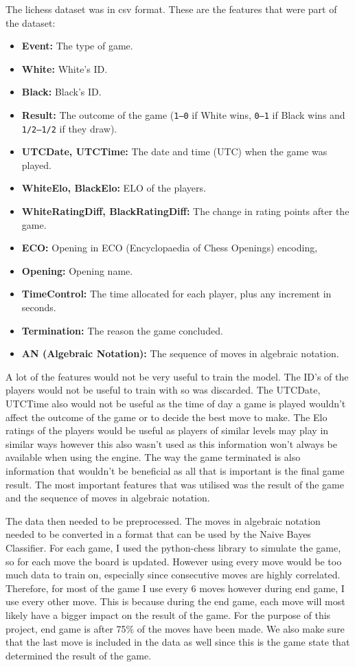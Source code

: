 The lichess dataset was in csv format. These are the features that were part of the dataset:

\begin{itemize}
    \item \textbf{Event:} The type of game.
    \item \textbf{White:} White's ID.
    \item \textbf{Black:} Black's ID.
    \item \textbf{Result:} The outcome of the game (\texttt{1--0} if White wins, \texttt{0--1} if Black wins and \texttt{1/2--1/2} if they draw).
    \item \textbf{UTCDate, UTCTime:} The date and time (UTC) when the game was played.
    \item \textbf{WhiteElo, BlackElo:} ELO of the players.
    \item \textbf{WhiteRatingDiff, BlackRatingDiff:} The change in rating points after the game.
    \item \textbf{ECO:} Opening in ECO (Encyclopaedia of Chess Openings) encoding,
    \item \textbf{Opening:} Opening name.
    \item \textbf{TimeControl:} The time allocated for each player, plus any increment in seconds.
    \item \textbf{Termination:} The reason the game concluded.
    \item \textbf{AN (Algebraic Notation):} The sequence of moves in algebraic notation.
\end{itemize}

A lot of the features would not be very useful to train the model. The ID's of the players would not be useful to train with so was discarded. The UTCDate, UTCTime also would not be useful as the time of day a game is played wouldn't affect the outcome of the game or to decide the best move to make. The Elo ratings of the players would be useful as players of similar levels may play in similar ways however this also wasn't used as this information won't always be available when using the engine. The way the game terminated is also information that wouldn't be beneficial as all that is important is the final game result. The most important features that was utilised was the result of the game and the sequence of moves in algebraic notation.

The data then needed to be preprocessed. The moves in algebraic notation needed to be converted in a format that can be used by the Naive Bayes Classifier. For each game, I used the python-chess library to simulate the game, so for each move the board is updated. However using every move would be too much data to train on, especially since consecutive moves are highly correlated. Therefore, for most of the game I use every 6 moves however during end game, I use every other move. This is because during the end game, each move will most likely have a bigger impact on the result of the game. For the purpose of this project, end game is after 75\% of the moves have been made. We also make sure that the last move is included in the data as well since this is the game state that determined the result of the game.

